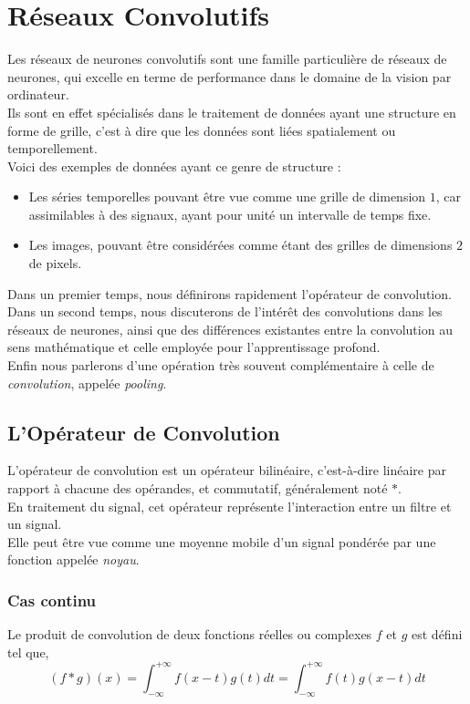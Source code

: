 \documentclass[10pt,a4paper]{report}
\begin{document}
		\section{Réseaux Convolutifs}
		Les réseaux de neurones convolutifs sont une famille particulière de réseaux de neurones, qui excelle en terme de performance dans le domaine de la vision par ordinateur.\\
	Ils sont en effet spécialisés dans le traitement de données ayant une structure en forme de grille, c'est à dire que les données sont liées spatialement ou temporellement.\\
	Voici des exemples de données ayant ce genre de structure :
	\begin{itemize}
		\item Les séries temporelles pouvant être vue comme une grille de dimension $1$, car assimilables à des signaux, ayant pour unité un intervalle de temps fixe.
		\item Les images, pouvant être considérées comme étant des grilles de dimensions $2$ de pixels.
	\end{itemize}
	Dans un premier temps, nous définirons rapidement l'opérateur de convolution.\\
	Dans un second temps, nous discuterons de l'intérêt des convolutions dans les réseaux de neurones, ainsi que des différences existantes entre la convolution au sens mathématique et celle employée pour l'apprentissage profond.\\
	Enfin nous parlerons d'une opération très souvent complémentaire à celle de \emph{convolution}, appelée \emph{pooling}.
		\subsection{L'Opérateur de Convolution}
		L'opérateur de convolution est un opérateur bilinéaire, c'est-à-dire linéaire par rapport à chacune des opérandes, et commutatif, généralement noté $*$.\\
		En traitement du signal, cet opérateur représente l’interaction entre un filtre et un signal.\\
		Elle peut être vue comme une moyenne mobile d'un signal pondérée par une fonction appelée \emph{noyau}.
			\subsubsection{Cas continu}
			Le produit de convolution de deux fonctions réelles ou complexes $f$ et $g$ est défini tel que,
			$$(f * g)(x) = \int_{-\infty}^{+\infty}{f(x-t)g(t)dt} = \int_{-\infty}^{+\infty}{f(t)g(x-t)dt}$$
\end{document}
